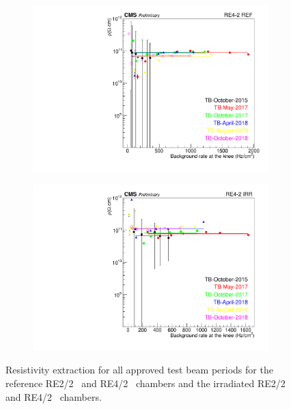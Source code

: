 \begin{figure}[H]
\begin{subfigure}{0.5\linewidth}
        	\caption{\label{fig:Resistivity-Fit:B}}
    	\end{subfigure}
    	\begin{subfigure}{0.5\linewidth}
			\centering
    		\includegraphics[width = \linewidth]{fig/chapt5/Resistivity-vs-Rate-CERN-165.pdf}
        	\caption{\label{fig:Resistivity-Fit:C}}
    	\end{subfigure}
    	\begin{subfigure}{0.5\linewidth}
			\centering
    		\includegraphics[width = \linewidth]{fig/chapt5/Resistivity-vs-Rate-CERN-166.pdf}
        	\caption{\label{fig:Resistivity-Fit:D}}
    	\end{subfigure}
		\caption{\label{fig:Resistivity-Fit} Resistivity extraction for all approved test beam periods for the reference RE2/2~ and RE4/2~ chambers and the irradiated RE2/2~ and RE4/2~ chambers.}
	\end{figure}
	

